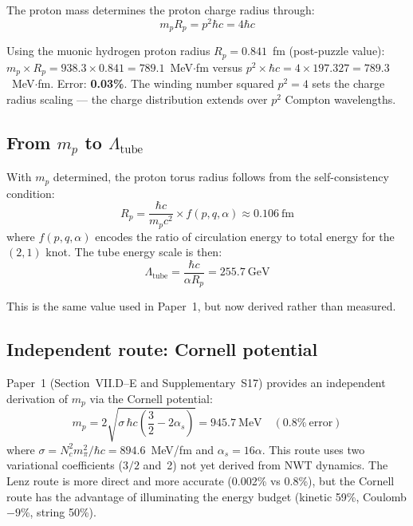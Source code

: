 \documentclass[11pt,a4paper]{article}
\begin{document}
The proton mass determines the proton charge radius through:
\begin{equation}
  m_p R_p = p^2 \hbar c = 4\hbar c
  \label{eq:charge-radius}
\end{equation}

Using the muonic hydrogen proton radius $R_p = 0.841$~fm (post-puzzle value): $m_p \times R_p = 938.3 \times 0.841 = 789.1$~MeV$\cdot$fm versus $p^2 \times \hbar c = 4 \times 197.327 = 789.3$~MeV$\cdot$fm. Error: \textbf{0.03\%}. The winding number squared $p^2 = 4$ sets the charge radius scaling --- the charge distribution extends over $p^2$ Compton wavelengths.

\subsection{From $m_p$ to $\Lambda_{\text{tube}}$}

With $m_p$ determined, the proton torus radius follows from the self-consistency condition:
\begin{equation}
  R_p = \frac{\hbar c}{m_p c^2} \times f(p,q,\alpha) \approx 0.106~\text{fm}
\end{equation}
where $f(p,q,\alpha)$ encodes the ratio of circulation energy to total energy for the $(2,1)$ knot. The tube energy scale is then:
\begin{equation}
  \Lambda_{\text{tube}} = \frac{\hbar c}{\alpha R_p} = 255.7~\text{GeV}
  \label{eq:tube-scale}
\end{equation}

This is the same value used in Paper~1, but now derived rather than measured.

\subsection{Independent route: Cornell potential}

Paper~1 (Section~VII.D--E and Supplementary~S17) provides an independent derivation of $m_p$ via the Cornell potential:
\begin{equation}
  m_p = 2\sqrt{\sigma\,\hbar c\!\left(\frac{3}{2} - 2\alpha_s\right)} = 945.7~\text{MeV} \quad (0.8\%~\text{error})
\end{equation}
where $\sigma = N_c^2 m_\pi^2/\hbar c = 894.6$~MeV/fm and $\alpha_s = 16\alpha$. This route uses two variational coefficients ($3/2$ and~2) not yet derived from NWT dynamics. The Lenz route is more direct and more accurate (0.002\% vs 0.8\%), but the Cornell route has the advantage of illuminating the energy budget (kinetic 59\%, Coulomb $-9$\%, string 50\%).
\end{document}
